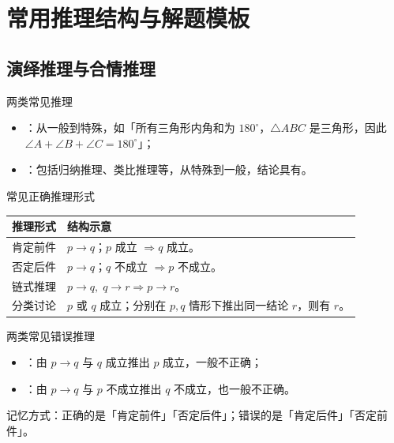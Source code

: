 \documentclass[a4paper,11pt]{ctexart}
\begin{document}
\clearpage
\section{常用推理结构与解题模板}

\subsection{演绎推理与合情推理}

\begin{definitionbox}{两类常见推理}
  \begin{itemize}
    \item {}：从一般到特殊，如「所有三角形内角和为 $180^\circ$，$\triangle ABC$ 是三角形，因此 $\angle A+\angle B+\angle C=180^\circ$」；
    \item {}：包括归纳推理、类比推理等，从特殊到一般，结论具有。
  \end{itemize}
\end{definitionbox}

\begin{summarybox}{常见正确推理形式}
  \begin{center}
  \begin{tabularx}{0.98\textwidth}{>{\raggedright\arraybackslash}p{4.4cm}X}
    \toprule
    \textbf{推理形式} & \textbf{结构示意} \\
    \midrule
    肯定前件 & $p\to q$；$p$ 成立 $\Rightarrow q$ 成立。 \\
    否定后件 & $p\to q$；$q$ 不成立 $\Rightarrow p$ 不成立。 \\
    链式推理 & $p\to q,\;q\to r\Rightarrow p\to r$。 \\
    分类讨论 & $p$ 或 $q$ 成立；分别在 $p,q$ 情形下推出同一结论 $r$，则有 $r$。 \\
    \bottomrule
  \end{tabularx}
  \end{center}
\end{summarybox}

\begin{warningbox}{两类常见错误推理}
  \begin{itemize}
    \item {}：由 $p\to q$ 与 $q$ 成立推出 $p$ 成立，一般不正确；
    \item {}：由 $p\to q$ 与 $p$ 不成立推出 $q$ 不成立，也一般不正确。
  \end{itemize}
  记忆方式：正确的是「肯定前件」「否定后件」；错误的是「肯定后件」「否定前件」。
\end{warningbox}
\end{document}
